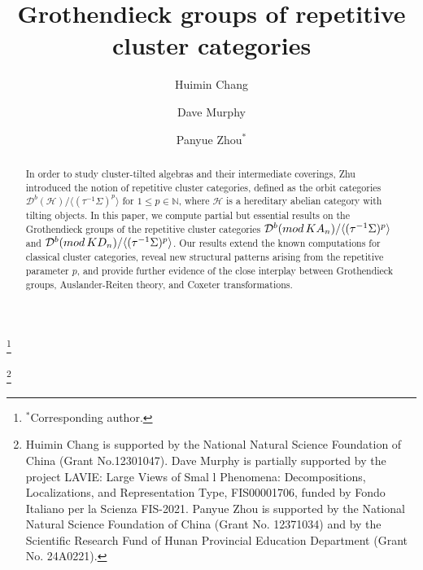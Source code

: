 \documentclass[a4paper,reqno,11pt]{amsart}
\newcommand{\cal}{\mathcal}
\theoremstyle{definition}
\def\D{\mathcal{D}}
\def\H{\mathcal {H}}
\renewcommand{\mod}{\mathop{\rm mod}\nolimits}%
\begin{document}

\title{Grothendieck groups of repetitive cluster categories}

\author{Huimin Chang}
\address{
Department of Applied Mathematics,
The Open University of China,
100039 Beijing,
P. R. China
}

\author{Dave Murphy}
\address{
Department of Computer Science\\
	University of Verona\\
	Strada le Grazie 15\\
	37134, Verona\\
	Italy}

\author[Panyue Zhou]{Panyue Zhou$^\ast$}
\address{School of Mathematics and Statistics, Changsha University of Science and Technology, 410114 Changsha, Hunan,  P. R. China}

\thanks{$^\ast$Corresponding author.}
\begin{abstract}
 In order to study cluster-tilted algebras and their intermediate coverings, Zhu introduced the notion of repetitive cluster categories, defined as the orbit categories $\D^b(\H)/\langle(\tau^{-1}\Sigma)^p\rangle$ for $1\leq p\in\mathbb{N}$, where $\H$ is a hereditary abelian category with tilting objects. In this paper, we compute partial but essential results on the Grothendieck groups of the repetitive cluster categories $\D^b(\mod KA_n)/\langle(\tau^{-1}\Sigma)^p\rangle$ and $\D^b(\mod KD_n)/\langle(\tau^{-1}\Sigma)^p\rangle$. Our results extend the known computations for classical cluster categories, reveal new structural patterns arising from the repetitive parameter $p$, and provide further evidence of the close interplay between Grothendieck groups, Auslander-Reiten theory, and Coxeter transformations.
\end{abstract}







\thanks{Huimin Chang is supported by the National Natural Science Foundation of China (Grant No.12301047). Dave Murphy is partially supported by the project LAVIE: Large Views of Smal l Phenomena: Decompositions, Localizations, and Representation Type, FIS00001706, funded by Fondo Italiano per la Scienza FIS-2021.
Panyue Zhou is supported by the National Natural Science Foundation of China (Grant No. 12371034) and by the Scientific Research Fund of Hunan Provincial Education Department (Grant No. 24A0221).}
\maketitle
\end{document}
